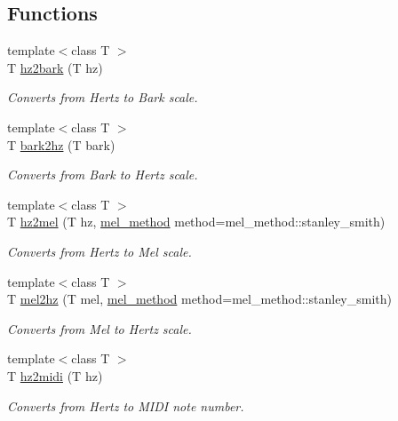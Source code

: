 \subsection*{Functions}
\begin{DoxyCompactItemize}
\item 
{\footnotesize template$<$class T $>$ }\\T \mbox{\hyperlink{namespacedsp_1_1convert_a0b152543bc9b736fcb0915da5306b323}{hz2bark}} (T hz)
\begin{DoxyCompactList}\small\item\em Converts from Hertz to Bark scale. \end{DoxyCompactList}\item 
{\footnotesize template$<$class T $>$ }\\T \mbox{\hyperlink{namespacedsp_1_1convert_ab44ee4c21ada8c728615e68891b05aa3}{bark2hz}} (T bark)
\begin{DoxyCompactList}\small\item\em Converts from Bark to Hertz scale. \end{DoxyCompactList}\item 
{\footnotesize template$<$class T $>$ }\\T \mbox{\hyperlink{namespacedsp_1_1convert_ac4a9cb55357dd1aee75adf49d8181c44}{hz2mel}} (T hz, \mbox{\hyperlink{namespacedsp_1_1convert_a597c04e9527c14c1280a917016852b59}{mel\+\_\+method}} method=mel\+\_\+method\+::stanley\+\_\+smith)
\begin{DoxyCompactList}\small\item\em Converts from Hertz to Mel scale. \end{DoxyCompactList}\item 
{\footnotesize template$<$class T $>$ }\\T \mbox{\hyperlink{namespacedsp_1_1convert_ac9b36e4ccd67735222b8fc4366612873}{mel2hz}} (T mel, \mbox{\hyperlink{namespacedsp_1_1convert_a597c04e9527c14c1280a917016852b59}{mel\+\_\+method}} method=mel\+\_\+method\+::stanley\+\_\+smith)
\begin{DoxyCompactList}\small\item\em Converts from Mel to Hertz scale. \end{DoxyCompactList}\item 
{\footnotesize template$<$class T $>$ }\\T \mbox{\hyperlink{namespacedsp_1_1convert_a4b8471f6dcaf273511b71a96868df49a}{hz2midi}} (T hz)
\begin{DoxyCompactList}\small\item\em Converts from Hertz to M\+I\+DI note number. \end{DoxyCompactList}\item 

\end{DoxyCompactItemize}
